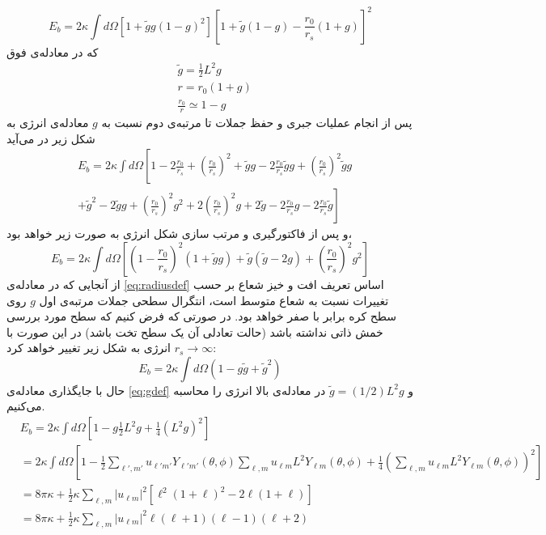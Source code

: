 \begin{equation}
E_b=2\kappa\int d\Omega\left[1+\tilde gg(1-g)^2\right]\left[1+\tilde g(1-g)-\frac{r_0}{r_s}(1+g)\right]^2
\end{equation}
که در معادله‌ی فوق
\begin{equation}
\begin{aligned}
&\tilde{g}=\frac{1}{2}L^2g\\
&r=r_0(1+g)\\
&\frac{r_0}{r}\simeq 1-g
\label{eq:ebsubs}
\end{aligned}
\end{equation}
پس از انجام عملیات جبری و حفظ جملات تا مرتبه‌ی دوم نسبت به $g$
معادله‌ی انرژی به شکل زیر در می‌آید
\begin{equation}
\begin{aligned}
&E_b=2\kappa\int d\Omega\left[1-2\frac{r_0}{r_s}+\left(\frac{r_0}{r_s}\right)^2+\tilde gg -2\frac{r_0}{r_s}\tilde gg+\left(\frac{r_0}{r_s}\right)^2\tilde gg\right.\\
&\left.+\tilde g^2-2\tilde gg +\left(\frac{r_0}{r_s}\right)^2g^2+2\left(\frac{r_0}{r_s}\right)^2g+2\tilde g-2\frac{r_0}{r_s}g-2\frac{r_0}{r_s}\tilde g\right]
\end{aligned}
\end{equation}
و پس از فاکتورگیری و مرتب سازی شکل انرژی به صورت زیر خواهد بود، 
\begin{equation}
E_b=2\kappa\int d\Omega\left[\left(1-\frac{r_0}{r_s}\right)^2(1+\tilde gg)+\tilde g(\tilde g-2g)+\left(\frac{r_0}{r_s}\right)^2g^2\right]
\label{eq:ebfinal}
\end{equation}
از آنجایی که در معادله‌ی
\ref{eq:radiusdef}
اساس تعریف افت و خیز شعاع بر حسب تغییرات نسبت به شعاع متوسط است، انتگرال سطحی جملات مرتبه‌ی اول $g$ روی سطح کره برابر با صفر خواهد بود. در صورتی که فرض کنیم که سطح مورد بررسی خمش ذاتی نداشته باشد (حالت تعادلی آن یک سطح تخت باشد) در این صورت با $r_s\rightarrow\infty$ انرژی به شکل زیر تغییر خواهد کرد:
\begin{equation}
E_b=2\kappa\int d\Omega\left(1-g\tilde g+\tilde g^2\right)
\label{eq:ebfinalnors}
\end{equation}
حال با جایگذاری معادله‌ی
\ref{eq:gdef}
و $\tilde g=(1/2)L^2g$ در معادله‌ی بالا انرژی را محاسبه می‌کنیم.
\begin{equation}
\begin{aligned}
&E_b=2\kappa\int d\Omega\left[1-g\frac{1}{2}L^2g+\frac{1}{4}\left(L^2g\right)^2\right]\\
&=2\kappa\int d\Omega\left[1-\frac{1}{2}\sum_{\ell',m'}u_{\ell' m'}Y_{\ell' m'} (\theta,\phi)\sum_{\ell,m}u_{\ell m}L^2Y_{\ell m} (\theta,\phi)+\frac{1}{4}\left(\sum_{\ell,m}u_{\ell m}L^2Y_{\ell m} (\theta,\phi)\right)^2\right]\\
&=8\pi \kappa+\frac{1}{2}\kappa\sum_{\ell,m}|u_{\ell m}|^2\left[\ell^2(1+\ell)^2-2\ell(1+\ell)\right]\\
&=8\pi\kappa+\frac{1}{2}\kappa\sum_{\ell,m}|u_{\ell m}|^2\ell(\ell+1)(\ell-1)(\ell+2)
\label{eq:curvatureYLM}
\end{aligned}
\end{equation}
